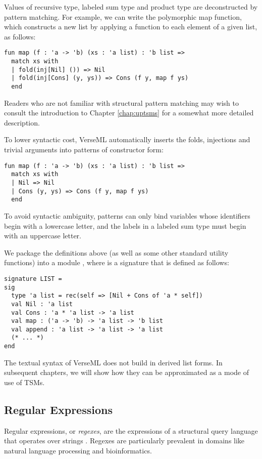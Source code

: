 Values of recursive type, labeled sum type and product type are deconstructed by pattern matching. For example, we can write the polymorphic map function, which constructs a new list by applying a function to each element of a given list, as follows:
\begin{lstlisting}[numbers=none]
fun map (f : 'a -> 'b) (xs : 'a list) : 'b list => 
  match xs with 
  | fold(inj[Nil] ()) => Nil
  | fold(inj[Cons] (y, ys)) => Cons (f y, map f ys)
  end
\end{lstlisting}
Readers who are not familiar with structural pattern matching may wish to consult the introduction to Chapter \ref{chap:uptsms} for a somewhat more detailed description.

To lower syntactic cost, VerseML automatically inserts the folds, injections and trivial arguments into patterns of constructor form:
\begin{lstlisting}[numbers=none]
fun map (f : 'a -> 'b) (xs : 'a list) : 'b list => 
  match xs with 
  | Nil => Nil 
  | Cons (y, ys) => Cons (f y, map f ys)
  end
\end{lstlisting}
To avoid syntactic ambiguity, patterns can only bind variables whose identifiers begin with a lowercase letter, and the labels in a labeled sum type must begin with an uppercase letter. 

We package the definitions above (as well as some other standard utility functions) into a module , where  is a signature that is defined as follows:
\begin{lstlisting}[numbers=none]
signature LIST = 
sig 
  type 'a list = rec(self => [Nil + Cons of 'a * self])
  val Nil : 'a list
  val Cons : 'a * 'a list -> 'a list
  val map : ('a -> 'b) -> 'a list -> 'b list
  val append : 'a list -> 'a list -> 'a list
  (* ... *)
end
\end{lstlisting}

The textual syntax of VerseML does not build in derived list forms. In subsequent chapters, we will show how they can be approximated as a mode of use of TSMs.

\subsection{Regular Expressions}\label{sec:syntax-examples-regexps}
Regular expressions, or \emph{regexes}, are the expressions of a structural query language that operates over strings \cite{Thompson:1968:PTR:363347.363387}. Regexes are particularly prevalent in domains like natural language processing and bioinformatics.

